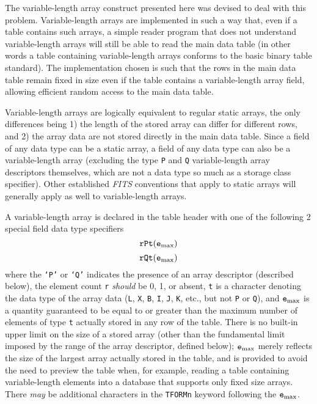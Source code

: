 \documentclass[11pt,makeidx]{book}     %
\begin{document}
The variable-length array construct
presented here was devised to
deal with this problem.  Variable-length arrays are implemented in
such a way that, even if a table contains such arrays, a simple reader
program that does not understand variable-length arrays will still be
able to read the main data table (in other words a table containing
variable-length arrays conforms to the basic binary table standard).
The implementation chosen is such that the rows in the main data table
remain fixed in size even if the table contains a variable-length
array field, allowing efficient random access to the main data table.

Variable-length arrays are logically equivalent to regular static
arrays, the only differences being 1) the length of the stored array
can differ for different rows, and 2) the array data are not stored
directly in the main data table.  Since a field of any data type can be a
static array, a field of any data type can also be a variable-length
array (excluding the type {\tt P} and {\tt Q} variable-length array descriptors
themselves, which are not a data type so much as a storage class specifier).
Other established {\em FITS\/} conventions that apply to static arrays will
generally apply as well to variable-length arrays.

A variable-length array is declared in the table header with one of the following
2 special field data type specifiers 
\[ {\tt rPt}({\tt e}_{\rm max}) \]
\[ {\tt rQt}({\tt e}_{\rm max}) \]
where the {\tt `P'} or {\tt `Q'} indicates the presence of an array descriptor 
(described below), the
element count {\tt r} {\em should} be 0, 1, or absent, {\tt t} is a character denoting
the data type of the array data ({\tt L},  {\tt X}, {\tt B},
{\tt I}, {\tt J}, {\tt K}, etc., but not {\tt P} or {\tt Q}), and ${\tt e}_{\rm max}$ is a
quantity guaranteed to be equal to or greater than the maximum number
of elements of type {\tt t} actually stored in any row of the table. There
is no built-in upper limit on the size of a stored array
(other than the fundamental limit imposed by the range of the array
descriptor, defined below);
${\tt e}_{\rm max}$ merely reflects the size of the largest array actually
stored in the table, and is provided to avoid the need to preview the
table when, for example, reading a table containing variable-length
elements into a database that supports only fixed size arrays.  There
{\em may} be additional characters in the {\tt TFORMn} keyword
following the ${\tt e}_{\rm max}$.
\end{document}
